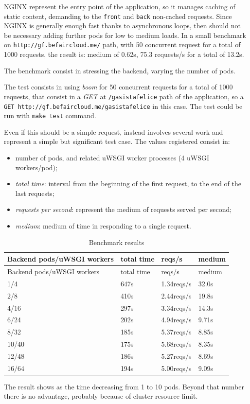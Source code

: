 NGINX  represent the entry point of the application, so it manages caching of static content, demanding to the \texttt{front} and \texttt{back} non-cached requests. Since NGINX is generally enough fast thanks to asynchronous loops, then should not be necessary adding further pods for low to medium loads.  In a small benchmark on \texttt{http://gf.befaircloud.me/} path, with 50 concurrent request for a total of 1000 requests, the result is:  medium of 0.62s, 75.3 requests/s for a total of 13.2s.

The benchmark consist in stressing the backend, varying the number of pods.

The test consists in using \textit{boom} for 50 concurrent requests for a total of 1000 requests, that consist in a \emph{GET} at \texttt{/gasistafelice} path of the application, so a \texttt{GET\ http://gf.befaircloud.me/gasistafelice} in this case.  The test could be run with \texttt{make test} command.

Even if this should be a simple request, instead involves several work and represent a simple but significant test case. The values registered consist in:

\begin{itemize}
\item number of pods, and related uWSGI worker processes (4 uWSGI workers/pod);
\item \textit{total time}: interval from the beginning of the first request,   to the end of the last requests;
\item \textit{requests per second}: represent the medium of requests served per second;
\item \textit{medium}: medium of time in responding to a single request.
\end{itemize}

\begin{longtable}[c]{@{}llll@{}}
\caption{Benchmark results}\tabularnewline
\toprule
Backend pods/uWSGI workers & total time & reqs/s & medium \tabularnewline
\midrule
\endfirsthead
\toprule
Backend pods/uWSGI workers & total time & reqs/s & medium \tabularnewline
\midrule
\endhead
1/4 & 647s & 1.34reqs/s & 32.0s \tabularnewline
2/8 & 410s & 2.44reqs/s & 19.8s \tabularnewline
4/16 & 297s & 3.34reqs/s & 14.3s \tabularnewline
6/24 & 202s & 4.94reqs/s & 9.71s \tabularnewline
8/32 & 185s & 5.37reqs/s & 8.85s \tabularnewline
10/40 & 175s & 5.68reqs/s & 8.35s \tabularnewline
12/48 & 186s & 5.27reqs/s & 8.69s \tabularnewline
16/64 & 194s & 5.00reqs/s & 9.09s \tabularnewline
\bottomrule
\end{longtable}

The result shows as the time decreasing from 1 to 10 pods. Beyond that number there is no advantage, probably because of cluster resource limit.